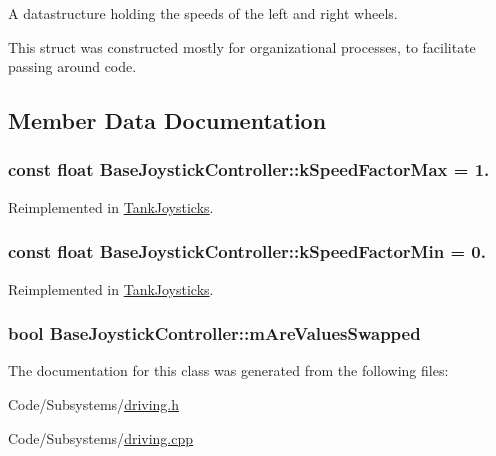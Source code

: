 \-A datastructure holding the speeds of the left and right wheels. 

\-This struct was constructed mostly for organizational processes, to facilitate passing around code. 

\subsection{\-Member \-Data \-Documentation}
\hypertarget{class_base_joystick_controller_ac6514f3d3abc38719f47e5e07ea61f0a}{
\subsubsection[{k\-Speed\-Factor\-Max}]{\setlength{\rightskip}{0pt plus 5cm}const float {\bf \-Base\-Joystick\-Controller\-::k\-Speed\-Factor\-Max} = 1.}}\label{class_base_joystick_controller_ac6514f3d3abc38719f47e5e07ea61f0a}


\-Reimplemented in \hyperlink{class_tank_joysticks_accc26be7603ec654301c9067920a070d}{\-Tank\-Joysticks}.

\hypertarget{class_base_joystick_controller_ae6950f7339ee1bc18437c6d1d364517f}{
\subsubsection[{k\-Speed\-Factor\-Min}]{\setlength{\rightskip}{0pt plus 5cm}const float {\bf \-Base\-Joystick\-Controller\-::k\-Speed\-Factor\-Min} = 0.}}\label{class_base_joystick_controller_ae6950f7339ee1bc18437c6d1d364517f}


\-Reimplemented in \hyperlink{class_tank_joysticks_abdba3d773862b977177d157a99d48196}{\-Tank\-Joysticks}.

\hypertarget{class_base_joystick_controller_a57b2686f5181fc4af7df37dd847d59fb}{
\subsubsection[{m\-Are\-Values\-Swapped}]{\setlength{\rightskip}{0pt plus 5cm}bool {\bf \-Base\-Joystick\-Controller\-::m\-Are\-Values\-Swapped}}}\label{class_base_joystick_controller_a57b2686f5181fc4af7df37dd847d59fb}


\-The documentation for this class was generated from the following files\-:\begin{DoxyCompactItemize}
\item 
\-Code/\-Subsystems/\hyperlink{driving_8h}{driving.\-h}\item 
\-Code/\-Subsystems/\hyperlink{driving_8cpp}{driving.\-cpp}\end{DoxyCompactItemize}
